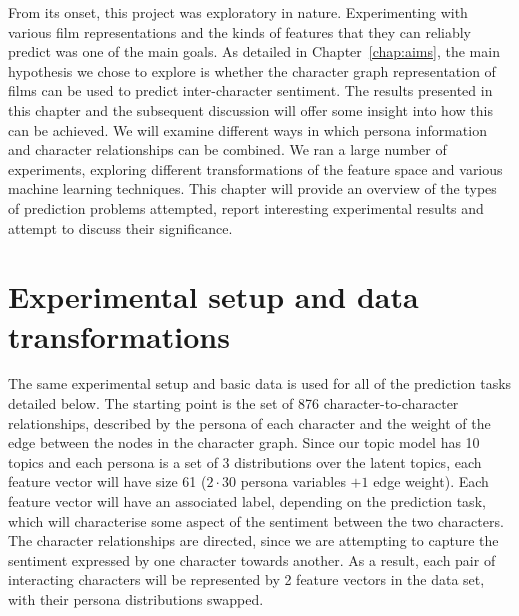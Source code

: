 \documentclass[bsc,frontabs,singlespacing,parskip, twoside]{infthesis}
\begin{document}
From its onset, this project was exploratory in nature. Experimenting with various film representations and the kinds of features that they can reliably predict was one of the main goals. As detailed in Chapter~\ref{chap:aims}, the main hypothesis we chose to explore is whether the character graph representation of films can be used to predict inter-character sentiment. The results presented in this chapter and the subsequent discussion will offer some insight into how this can be achieved. We will examine different ways in which persona information and character relationships can be combined. We ran a large number of experiments, exploring different transformations of the feature space and various machine learning techniques. This chapter will provide an overview of the types of prediction problems attempted, report interesting experimental results and attempt to discuss their significance.

\section{Experimental setup and data transformations}
The same experimental setup and basic data is used for all of the prediction tasks detailed below. The starting point is the set of 876 character-to-character relationships, described by the persona of each character and the weight of the edge between the nodes in the character graph. Since our topic model has 10 topics and each persona is a set of 3 distributions over the latent topics, each feature vector will have size 61 ($2 \cdot 30$ persona variables $+ 1$ edge weight). Each feature vector will have an associated label, depending on the prediction task, which will characterise some aspect of the sentiment between the two characters. The character relationships are directed, since we are attempting to capture the sentiment expressed by one character towards another. As a result, each pair of interacting characters will be represented by 2 feature vectors in the data set, with their persona distributions swapped.
\end{document}
